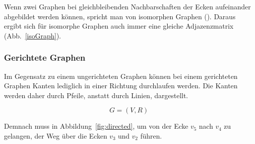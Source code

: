 Wenn zwei Graphen bei gleichbleibenden Nachbarschaften der Ecken aufeinander abgebildet werden können, spricht man von isomorphen Graphen (\cite[106]{theory}).
Daraus ergibt sich für isomorphe Graphen auch immer eine gleiche Adjazenzmatrix (Abb.~\ref{isoGraph}).


\subsubsection{Gerichtete Graphen}
Im Gegensatz zu einem ungerichteten Graphen können bei einem gerichteten Graphen Kanten lediglich in einer Richtung durchlaufen werden.
Die Kanten werden daher durch Pfeile, anstatt durch Linien, dargestellt.

$$G = (V,R)$$

Demnach muss in Abbildung~\ref{fig:directed}, um von der Ecke $v_{5}$ nach $v_{4}$ zu gelangen, der Weg über die Ecken $v_{3}$ und $v_{2}$ führen.

